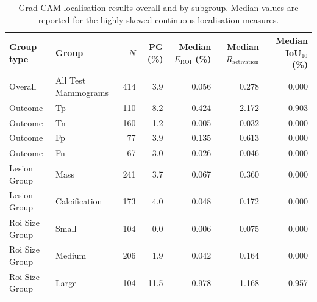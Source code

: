 \begin{table}[htbp]
\centering
\caption{Grad-CAM localisation results overall and by subgroup. Median values are reported for the highly skewed continuous localisation measures.}
\label{tab:gradcam-subgroup-results}
\small
\begin{tabular}{llrrrrr}
\hline
Group type & Group & $N$ & PG (\%) & Median $E_{\mathrm{ROI}}$ (\%) & Median $R_{\mathrm{activation}}$ & Median IoU$_{10}$ (\%) \\
\hline
Overall & All Test Mammograms & 414 & 3.9 & 0.056 & 0.278 & 0.000 \\
\hline
Outcome & Tp & 110 & 8.2 & 0.424 & 2.172 & 0.903 \\
Outcome & Tn & 160 & 1.2 & 0.005 & 0.032 & 0.000 \\
Outcome & Fp & 77 & 3.9 & 0.135 & 0.613 & 0.000 \\
Outcome & Fn & 67 & 3.0 & 0.026 & 0.046 & 0.000 \\
\hline
Lesion Group & Mass & 241 & 3.7 & 0.067 & 0.360 & 0.000 \\
Lesion Group & Calcification & 173 & 4.0 & 0.048 & 0.172 & 0.000 \\
\hline
Roi Size Group & Small & 104 & 0.0 & 0.006 & 0.075 & 0.000 \\
Roi Size Group & Medium & 206 & 1.9 & 0.042 & 0.164 & 0.000 \\
Roi Size Group & Large & 104 & 11.5 & 0.978 & 1.168 & 0.957 \\
\hline
\end{tabular}
\end{table}
